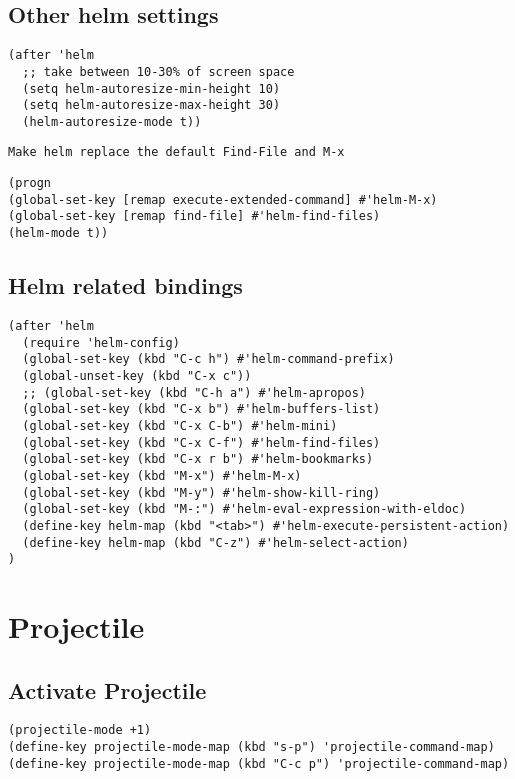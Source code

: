 \documentclass[11pt]{article}
\begin{document}
\subsection*{Other helm settings}
\label{sec:orgea8e9a8}

\begin{verbatim}
(after 'helm
  ;; take between 10-30% of screen space
  (setq helm-autoresize-min-height 10)
  (setq helm-autoresize-max-height 30)
  (helm-autoresize-mode t))
\end{verbatim}

\begin{verbatim}
Make helm replace the default Find-File and M-x
\end{verbatim}


\begin{verbatim}
(progn
(global-set-key [remap execute-extended-command] #'helm-M-x)
(global-set-key [remap find-file] #'helm-find-files)
(helm-mode t))
\end{verbatim}

\subsection*{Helm related bindings}
\label{sec:orge900aa9}

\begin{verbatim}
(after 'helm
  (require 'helm-config)
  (global-set-key (kbd "C-c h") #'helm-command-prefix)
  (global-unset-key (kbd "C-x c"))
  ;; (global-set-key (kbd "C-h a") #'helm-apropos)
  (global-set-key (kbd "C-x b") #'helm-buffers-list)
  (global-set-key (kbd "C-x C-b") #'helm-mini)
  (global-set-key (kbd "C-x C-f") #'helm-find-files)
  (global-set-key (kbd "C-x r b") #'helm-bookmarks)
  (global-set-key (kbd "M-x") #'helm-M-x)
  (global-set-key (kbd "M-y") #'helm-show-kill-ring)
  (global-set-key (kbd "M-:") #'helm-eval-expression-with-eldoc)
  (define-key helm-map (kbd "<tab>") #'helm-execute-persistent-action)
  (define-key helm-map (kbd "C-z") #'helm-select-action)
)
\end{verbatim}


\section*{Projectile}
\label{sec:org9b277b0}

\subsection*{Activate Projectile}
\label{sec:org4ffd080}
\begin{verbatim}
(projectile-mode +1)
(define-key projectile-mode-map (kbd "s-p") 'projectile-command-map)
(define-key projectile-mode-map (kbd "C-c p") 'projectile-command-map)
\end{verbatim}
\end{document}
